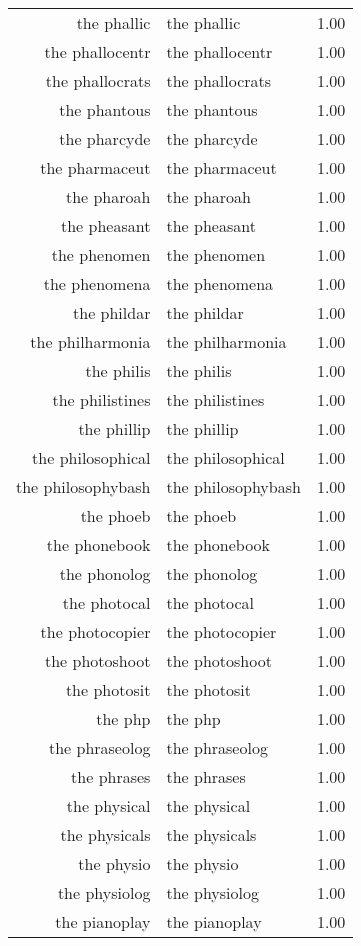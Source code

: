 \begin{table}[ht]
\begin{tabular}{rlr}
  the phallic & the phallic & 1.00 \\ 
  the phallocentr & the phallocentr & 1.00 \\ 
  the phallocrats & the phallocrats & 1.00 \\ 
  the phantous & the phantous & 1.00 \\ 
  the pharcyde & the pharcyde & 1.00 \\ 
  the pharmaceut & the pharmaceut & 1.00 \\ 
  the pharoah & the pharoah & 1.00 \\ 
  the pheasant & the pheasant & 1.00 \\ 
  the phenomen & the phenomen & 1.00 \\ 
  the phenomena & the phenomena & 1.00 \\ 
  the phildar & the phildar & 1.00 \\ 
  the philharmonia & the philharmonia & 1.00 \\ 
  the philis & the philis & 1.00 \\ 
  the philistines & the philistines & 1.00 \\ 
  the phillip & the phillip & 1.00 \\ 
  the philosophical & the philosophical & 1.00 \\ 
  the philosophybash & the philosophybash & 1.00 \\ 
  the phoeb & the phoeb & 1.00 \\ 
  the phonebook & the phonebook & 1.00 \\ 
  the phonolog & the phonolog & 1.00 \\ 
  the photocal & the photocal & 1.00 \\ 
  the photocopier & the photocopier & 1.00 \\ 
  the photoshoot & the photoshoot & 1.00 \\ 
  the photosit & the photosit & 1.00 \\ 
  the php & the php & 1.00 \\ 
  the phraseolog & the phraseolog & 1.00 \\ 
  the phrases & the phrases & 1.00 \\ 
  the physical & the physical & 1.00 \\ 
  the physicals & the physicals & 1.00 \\ 
  the physio & the physio & 1.00 \\ 
  the physiolog & the physiolog & 1.00 \\ 
  the pianoplay & the pianoplay & 1.00 \\ 

\end{tabular}
\end{table}
